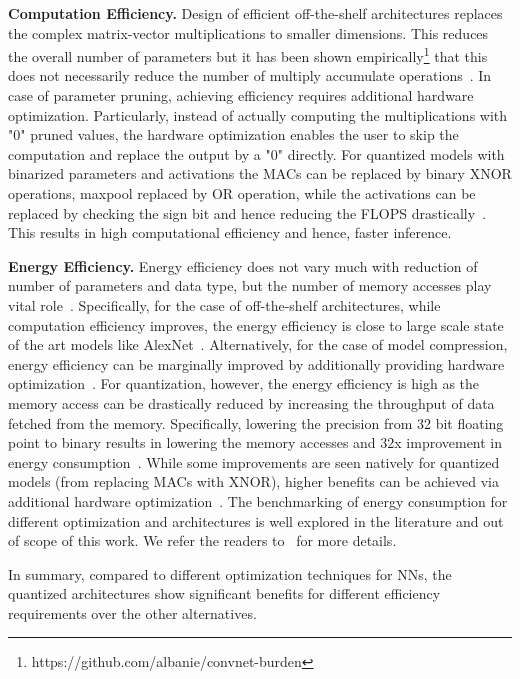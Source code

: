 \noindent\textbf{Computation Efficiency.} Design of efficient off-the-shelf architectures replaces the complex matrix-vector multiplications to smaller dimensions.
This reduces the overall number of parameters but it has been shown empirically\footnote{https://github.com/albanie/convnet-burden} that this does not necessarily reduce the number of multiply accumulate operations~\cite{article}.
In case of parameter pruning, achieving efficiency requires additional hardware optimization. Particularly, instead of actually computing the multiplications with "0" pruned values, the hardware optimization enables the user to skip the computation and replace the output by a "0" directly.
For quantized models with binarized parameters and activations the MACs can be replaced by binary XNOR operations, maxpool replaced by OR operation, while the activations can be replaced by checking the sign bit and hence reducing the FLOPS drastically~\cite{235489}.
This results in high computational efficiency and hence, faster inference.


\noindent\textbf{Energy Efficiency.} Energy efficiency does not vary much with reduction of number of parameters and data type, but the number of memory accesses play vital role~\cite{6757323}.
Specifically, for the case of off-the-shelf architectures, while computation efficiency improves, the energy efficiency is close to large scale state of the art models like AlexNet~\cite{DBLP:journals/corr/IandolaMAHDK16,8114708}.
Alternatively, for the case of model compression, energy efficiency can be marginally improved by additionally providing hardware optimization~\cite{journals/corr/YangCS16a,DBLP:journals/corr/HanMD15}.
For quantization, however, the energy efficiency is high as the memory access can be drastically reduced by increasing the throughput of data fetched from the memory.
Specifically, lowering the precision from 32 bit floating point to binary results in lowering the memory accesses and 32x improvement in energy consumption~\cite{NIPS2016_6573,rastegari2016xnornet}.
While some improvements are seen natively for quantized models (from replacing MACs with XNOR), higher benefits can be achieved via additional hardware optimization~\cite{Umuroglu2017FINNAF}.
The benchmarking of energy consumption for different optimization and architectures is well explored in the literature and out of scope of this work. We refer the readers to~\cite{8114708} for more details.

In summary, compared to different optimization techniques for NNs, the quantized architectures show significant benefits for different efficiency requirements over the other alternatives.




